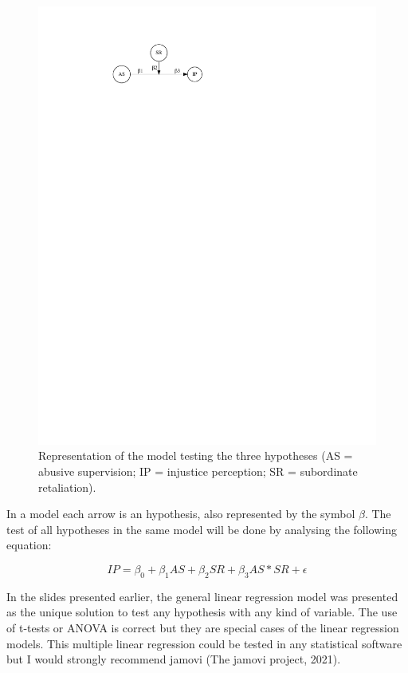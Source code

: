 \documentclass[
]{article}
\begin{document}
\begin{figure}
\centering
\includegraphics{voodoo_paper_dd_files/figure-latex/unnamed-chunk-1-1.pdf}
\caption{Representation of the model testing the three hypotheses (AS =
abusive supervision; IP = injustice perception; SR = subordinate
retaliation).}
\end{figure}

In a model each arrow is an hypothesis, also represented by the symbol
\(\beta\). The test of all hypotheses in the same model will be done by
analysing the following equation:

\[ IP = \beta_0 + \beta_1 AS + \beta_2 SR + \beta_3 AS * SR + \epsilon \]

In the slides presented earlier, the general linear regression model was
presented as the unique solution to test any hypothesis with any kind of
variable. The use of t-tests or ANOVA is correct but they are special
cases of the linear regression models. This multiple linear regression
could be tested in any statistical software but I would strongly
recommend jamovi (The jamovi project, 2021).
\end{document}
